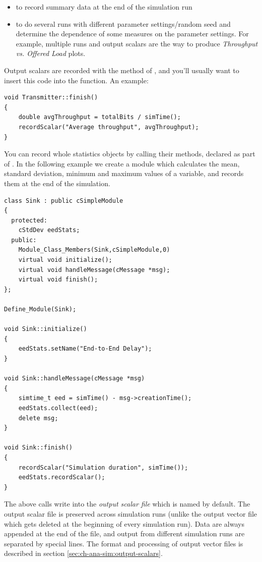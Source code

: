\begin{itemize}
\item{to record summary data at the end of the simulation run}
\item{to do several runs with different parameter settings/random seed
    and determine the dependence of some measures on the parameter
    settings. For example, multiple runs and output scalars are the
    way to produce \textit{Throughput vs. Offered Load} plots.}
\end{itemize}

Output scalars are recorded with the  method of
, and you'll usually want to insert this code
into the  function. An example:

\begin{verbatim}
void Transmitter::finish()
{
    double avgThroughput = totalBits / simTime();
    recordScalar("Average throughput", avgThroughput);
}
\end{verbatim}

You can record whole statistics objects by calling their 
methods, declared as part of . In the following example
we create a  module which calculates the mean, standard
deviation, minimum and maximum values of a variable, and records them at the
end of the simulation.

\begin{verbatim}
class Sink : public cSimpleModule
{
  protected:
    cStdDev eedStats;
  public:
    Module_Class_Members(Sink,cSimpleModule,0)
    virtual void initialize();
    virtual void handleMessage(cMessage *msg);
    virtual void finish();
};

Define_Module(Sink);

void Sink::initialize()
{
    eedStats.setName("End-to-End Delay");
}

void Sink::handleMessage(cMessage *msg)
{
    simtime_t eed = simTime() - msg->creationTime();
    eedStats.collect(eed);
    delete msg;
}

void Sink::finish()
{
    recordScalar("Simulation duration", simTime());
    eedStats.recordScalar();
}
\end{verbatim}

The above calls write into the \textit{output scalar file} which is named
 by default. The output scalar file is preserved across
simulation runs (unlike the output vector file which gets deleted
at the beginning of every simulation run).
Data are always appended at the end of the file, and
output from different simulation runs are separated by special lines.
The format and processing of output vector files is described in section
\ref{sec:ch-ana-sim:output-scalars}.




